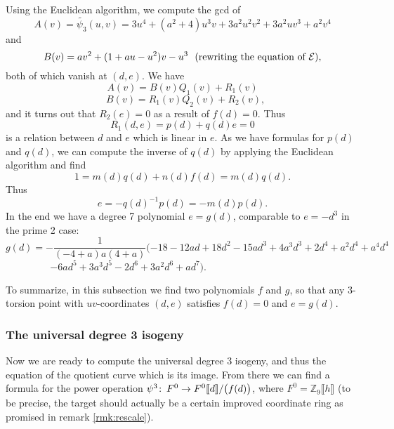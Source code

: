 \documentclass{gtpart}
\theoremstyle{definition}
\theoremstyle{remark}
\def\co{\colon\thinspace}
\newcommand{\mb}[1]{\mathbb{#1}}
\begin{document}
Using the Euclidean algorithm, we compute the gcd of 
\[
 A(v) = \widetilde{\psi_3}(u,v) = 3u^4 + (a^2 + 4) u^3 v + 3a^2 u^2 v^2 + 
 3a^2 u v^3 + a^2 v^4 
\]
and 
\[
 B(v) = a v^2 + (1 + a u - u^2) v - u^3~~\text{(rewriting the equation of 
 $\cal E$)}, 
\]
both of which vanish at $(d,e)$.  We have 
\[
 A(v) = B(v)Q_1(v) + R_1(v) 
\]
\[
 ~~~B(v) = R_1(v)Q_2(v) + R_2(v), 
\]
and it turns out that $R_2(e) = 0$ as a result of $f(d) = 0$.  Thus 
\[
 R_1(d,e) = p(d) + q(d) e = 0 
\]
is a relation between $d$ and $e$ which is linear in $e$.  As we have formulas 
for $p(d)$ and $q(d)$, we can compute the inverse of $q(d)$ by applying the 
Euclidean algorithm and find 
\[
 1 = m(d)q(d) + n(d)f(d) = m(d)q(d).  
\]
Thus 
\[
 e = -q(d)^{-1} p(d) = -m(d) p(d).  
\]
In the end we have a degree 7 polynomial $e = g(d)$, comparable to $e = -d^3$ 
in the prime 2 case: 
\[
 g(d) = -\frac{1}{(-4 + a) a (4 + a)} (-18 - 12 a d + 18 d^2 - 15 a d^3 + 
 4 a^3 d^3 + 2 d^4 + a^2 d^4 + a^4 d^4 
\]
\[
 - 6 a d^5 + 3 a^3 d^5 - 2 d^6 + 3 a^2 d^6 + a d^7).  
 ~~~~~~~~~~~~~~~~~~~~~~~~~~~~~~~~~~~~~~~~~~~~~~~~~~ 
\]

To summarize, in this subsection we find two polynomials $f$ and $g$, so that 
any 3-torsion point with $uv$-coordinates $(d,e)$ satisfies $f(d) = 0$ and 
$e = g(d)$.  


\subsubsection{The universal degree 3 isogeny}

Now we are ready to compute the universal degree 3 isogeny, and thus the 
equation of the quotient curve which is its image. From there we can find a 
formula for the power operation 
$\psi^3\co F^0  \to F^0 \llbracket d \rrbracket / \big(f(d)\big)$, where 
$F^0 = {\mb Z}_9 \llbracket h \rrbracket$ (to be precise, the target should 
actually be a certain improved coordinate ring as promised in remark 
\ref{rmk:rescale}).  
\end{document}
